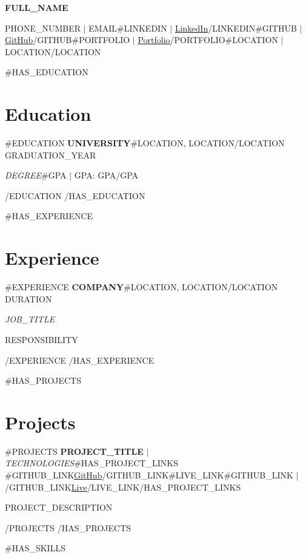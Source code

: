 \documentclass[10pt,letterpaper]{article}
\begin{document}
\begin{center}
{\Large \textbf{\uppercase{{{FULL_NAME}}}}}

\vspace{2pt}
{{PHONE_NUMBER}} $|$ {{EMAIL}}{{#LINKEDIN}} $|$ \href{{{LINKEDIN}}}{LinkedIn}{{/LINKEDIN}}{{#GITHUB}} $|$ \href{{{GITHUB}}}{GitHub}{{/GITHUB}}{{#PORTFOLIO}} $|$ \href{{{PORTFOLIO}}}{Portfolio}{{/PORTFOLIO}}{{#LOCATION}} $|$ {{LOCATION}}{{/LOCATION}}
\end{center}

{{#HAS_EDUCATION}}
\section*{Education}
{{#EDUCATION}}
\textbf{{{UNIVERSITY}}}{{#LOCATION}}, {{LOCATION}}{{/LOCATION}} \hfill {{GRADUATION_YEAR}}

\textit{{{DEGREE}}}{{#GPA}} $|$ GPA: {{GPA}}{{/GPA}}

{{/EDUCATION}}
{{/HAS_EDUCATION}}

{{#HAS_EXPERIENCE}}
\section*{Experience}
{{#EXPERIENCE}}
\textbf{{{COMPANY}}}{{#LOCATION}}, {{LOCATION}}{{/LOCATION}} \hfill {{DURATION}}

\textit{{{JOB_TITLE}}}
\begin{itemize}
{{RESPONSIBILITY}}
\end{itemize}

{{/EXPERIENCE}}
{{/HAS_EXPERIENCE}}

{{#HAS_PROJECTS}}
\section*{Projects}
{{#PROJECTS}}
\textbf{{{PROJECT_TITLE}}} $|$ \textit{{{TECHNOLOGIES}}}{{#HAS_PROJECT_LINKS}} \hfill{{#GITHUB_LINK}}\href{{{GITHUB_LINK}}}{GitHub}{{/GITHUB_LINK}}{{#LIVE_LINK}}{{#GITHUB_LINK}} $|$ {{/GITHUB_LINK}}\href{{{LIVE_LINK}}}{Live}{{/LIVE_LINK}}{{/HAS_PROJECT_LINKS}}
\begin{itemize}
{{PROJECT_DESCRIPTION}}
\end{itemize}

{{/PROJECTS}}
{{/HAS_PROJECTS}}

{{#HAS_SKILLS}}
\end{document}
